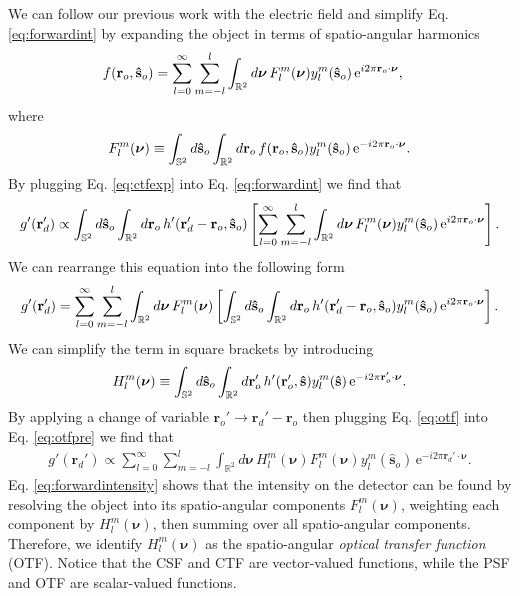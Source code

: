 \documentclass[11pt]{article}
\newcommand{\me}{\mathrm{e}}
\providecommand{\mb}[1]{\mathbf{#1}}
\providecommand{\ro}[1]{\mathbf{\mathbf{r}}_o}
\providecommand{\so}[1]{\mathbf{\hat{s}}_o}
\providecommand{\rd}[1]{\mathbf{r}_d}
\providecommand{\mh}[1]{\mathbf{\hat{#1}}}
\providecommand{\bs}[1]{\boldsymbol{#1}}
\begin{document}
We can follow our previous work with the electric field and simplify Eq.
\ref{eq:forwardint} by expanding the object in terms of spatio-angular harmonics
\begin{align}
  f(\ro{}, \so{}) &= \sum_{l=0}^{\infty} \sum_{m=-l}^l \int_{\mathbb{R}^2}d\bs{\nu}{}\, F_l^m(\bs{\nu})y_l^m(\so{})\thinspace\me^{i 2\pi \ro{}\cdot\bs{\nu}},\label{eq:ctfexp}
\end{align}
where 
\begin{align}
  F_l^m(\bs{\nu}) \equiv \int_{\mathbb{S}^2}d\so{}\int_{\mathbb{R}^2}d\ro{}\, f(\ro{}, \so{}) y_l^m(\so{})\thinspace\me^{-i 2\pi \ro{}\cdot\bs{\nu}}.\label{eq:ctfdef}
\end{align}
By plugging Eq. \ref{eq:ctfexp} into Eq. \ref{eq:forwardint} we find that
\begin{align}
  g'(\rd{}') \propto \int_{\mathbb{S}^2}d\so{}\int_{\mathbb{R}^2}d\ro{}\, h'(\rd{}' - \ro{}, \so{})\left[\sum_{l=0}^{\infty} \sum_{m=-l}^l \int_{\mathbb{R}^2}d\bs{\nu}{}\, F_l^m(\bs{\nu})y_l^m(\so{})\thinspace\me^{i 2\pi \ro{}\cdot\bs{\nu}}\right]. \label{eq:freqforwardint}
\end{align}
We can rearrange this equation into the following form
\begin{align}
  g'(\rd{}') = \sum_{l=0}^{\infty} \sum_{m=-l}^l \int_{\mathbb{R}^2}d\bs{\nu}{}\, F_l^m(\bs{\nu}) \left[\int_{\mathbb{S}^2}d\so{}\int_{\mathbb{R}^2}d\ro{}\, h'(\rd{}' - \ro{}, \so{})y_l^m(\so{})\thinspace\me^{i 2\pi \ro{}\cdot\bs{\nu}}\right]. \label{eq:otfpre}
\end{align}
We can simplify the term in square brackets by introducing 
\begin{align}
  H_l^m(\bs{\nu}) \equiv \int_{\mathbb{S}^2}d\so{}\int_{\mathbb{R}^2}d\ro{}'\, h'(\ro{}', \mh{s}) y_l^m(\mh{s})\thinspace\me^{-i 2\pi \ro{}'\cdot\bs{\nu}}. \label{eq:otf}
\end{align}
By applying a change of variable $\mb{r}_o' \rightarrow \rd{}' - \ro{}$ then plugging Eq.
\ref{eq:otf} into Eq. \ref{eq:otfpre} we find that 
\begin{align}
    g'(\rd{}') \propto \sum_{l=0}^{\infty} \sum_{m=-l}^l \int_{\mathbb{R}^2}d\bs{\nu}{}\, H_l^m(\bs{\nu})F_l^m(\bs{\nu})y_l^m(\so{})\, \me^{-i 2\pi \rd{}'\cdot\bs{\nu}}.\label{eq:forwardintensity}
\end{align}
Eq. \ref{eq:forwardintensity} shows that the intensity on the detector can be
found by resolving the object into its spatio-angular components
$F_l^m(\bs{\nu})$, weighting each component by $H_l^m(\bs{\nu})$, then
summing over all spatio-angular components. Therefore, we identify
$H_l^m(\bs{\nu})$ as the spatio-angular \textit{optical transfer function}
(OTF). Notice that the CSF and CTF are vector-valued functions, while the PSF
and OTF are scalar-valued functions.
\end{document}
